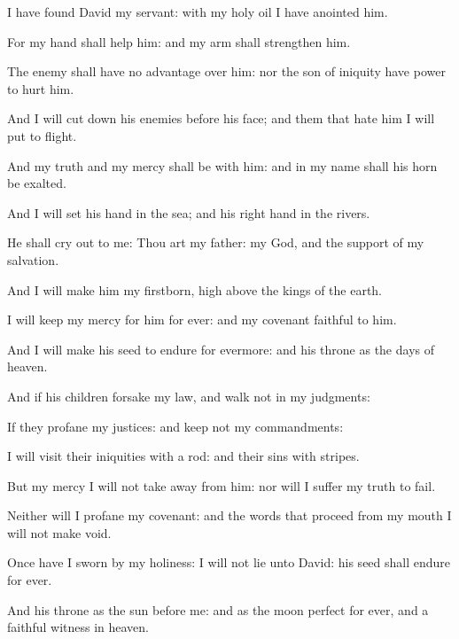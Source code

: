 \item I have found David my servant: with my holy oil I have anointed him.
\item For my hand shall help him: and my arm shall strengthen him.
\item The enemy shall have no advantage over him: nor the son of iniquity have power to hurt him.
\item And I will cut down his enemies before his face; and them that hate him I will put to flight.
\item And my truth and my mercy shall be with him: and in my name shall his horn be exalted.
\item And I will set his hand in the sea; and his right hand in the rivers.
\item He shall cry out to me: Thou art my father: my God, and the support of my salvation.
\item And I will make him my firstborn, high above the kings of the earth.
\item I will keep my mercy for him for ever: and my covenant faithful to him.
\item And I will make his seed to endure for evermore: and his throne as the days of heaven.
\item And if his children forsake my law, and walk not in my judgments: 
\item If they profane my justices: and keep not my commandments:
\item I will visit their iniquities with a rod: and their sins with stripes. 
\item But my mercy I will not take away from him: nor will I suffer my truth to fail.
\item Neither will I profane my covenant: and the words that proceed from my mouth I will not make void.
\item Once have I sworn by my holiness: I will not lie unto David: his seed shall endure for ever.
\item And his throne as the sun before me: and as the moon perfect for ever, and a faithful witness in heaven.